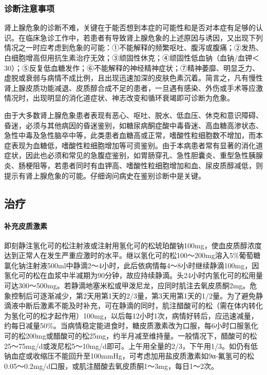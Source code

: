 \subsubsection{诊断注意事项}

肾上腺危象的诊断不难，关键在于能否想到本症的可能性和是否对本症有足够的认识。在临床急诊工作中，若患者有导致肾上腺危象的上述原因与诱因，又出现下列情况之一时应考虑到危象的可能：①不能解释的频繁呕吐、腹泻或腹痛；②发热、白细胞增高但用抗生素治疗无效；③顽固性休克；④顽固性低血钠（血钠/血钾＜
30）；⑤反复低血糖发作；⑥不能解释的神经精神症状；⑦精神萎靡、明显乏力、虚脱或衰弱与病情不成比例，且出现迅速加深的皮肤色素沉着。简言之，凡有慢性肾上腺皮质功能减退、皮质醇合成不足的患者，一旦遇有感染、外伤或手术等应激情况时，出现明显的消化道症状、神志改变和循环衰竭即可诊断为危象。

由于大多数肾上腺危象患者表现有恶心、呕吐、脱水、低血压、休克和意识障碍、昏迷，必须与其他病因的昏迷鉴别，如糖尿病酮症酸中毒昏迷、高血糖高渗状态、急性中毒及急性脑卒中等，此类患者血糖高或正常，嗜酸性粒细胞数不增加，而本症表现为血糖低，嗜酸性粒细胞增加等可资鉴别。由于本病患者常有显著的消化道症状，因此也必须和常见的急腹症鉴别，如胃肠穿孔、急性胆囊炎、重型急性胰腺炎、肠梗阻等，若患者同时有血钾高、嗜酸性粒细胞增加和血、尿皮质醇减低，则提示有肾上腺危象的可能。仔细询问病史在鉴别诊断中是关键。

\subsection{治疗}

\paragraph{补充皮质激素}

即刻静注氢化可的松注射液或注射用氢化可的松琥珀酸钠100mg，使血皮质醇浓度达到正常人在发生严重应激时的水平。继以氢化可的松100～200mg溶入5\%葡萄糖氯化钠注射液500ml中静滴2～4小时，此后依病情每4～8小时继续静滴100mg，因氢化可的松在血浆中半减期为90分钟，故应持续静滴。头24小时内氢化可的松用量可达300～500mg。若静滴地塞米松或甲泼尼龙，应同时肌注去氧皮质酮2mg。危象控制后可逐渐减少，第2天用第1天的2/3量，第3天用第1天的1/2量。为了避免静滴液中断后激素不能及时补充，可在静滴的同时，肌注醋酸可的松（需在体内转化为氢化可的松才起作用）100mg，以后每12小时1次，病情好转后，应迅速减量，约每日减量50\%。当病情稳定能进食时，糖皮质激素改为口服，每6小时口服氢化可的松200mg或醋酸可的松25mg，约半月减至维持量。一般情况下，醋酸可的松25～75mg/d或泼尼松5～10mg/d即可。上午用全量的2/3，下午用1/3。如仍有低钠血症或收缩压不能回升至100mmHg，可考虑加用盐皮质激素如9α-氟氢可的松0.05～0.2mg/d口服，或肌注醋酸去氧皮质酮1～3mg，每日1～2次。

